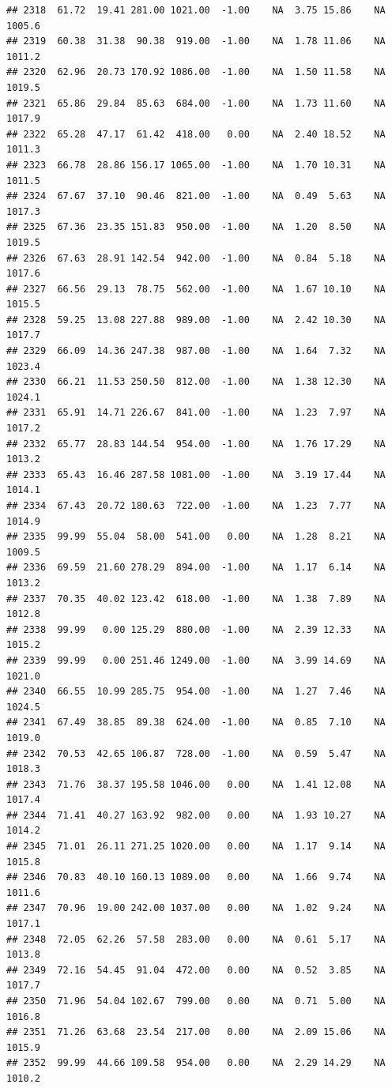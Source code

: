 \documentclass{article}\usepackage{graphicx, color}
\makeatletter
\newenvironment{kframe}{%
 \def\at@end@of@kframe{}%
 \ifinner\ifhmode%
  \def\at@end@of@kframe{\end{minipage}}%
  \begin{minipage}{\columnwidth}%
 \fi\fi%
 \def\FrameCommand##1{\hskip\@totalleftmargin \hskip-\fboxsep
 \colorbox{shadecolor}{##1}\hskip-\fboxsep
     \hskip-\linewidth \hskip-\@totalleftmargin \hskip\columnwidth}%
 \MakeFramed {\advance\hsize-\width
   \@totalleftmargin\z@ \linewidth\hsize
   \@setminipage}}%
 {\par\unskip\endMakeFramed%
 \at@end@of@kframe}
\newenvironment{knitrout}{}{} %
\makeatother
\begin{document}
\begin{knitrout}
\begin{kframe}
\begin{verbatim}
## 2318  61.72  19.41 281.00 1021.00  -1.00    NA  3.75 15.86    NA 1005.6
## 2319  60.38  31.38  90.38  919.00  -1.00    NA  1.78 11.06    NA 1011.2
## 2320  62.96  20.73 170.92 1086.00  -1.00    NA  1.50 11.58    NA 1019.5
## 2321  65.86  29.84  85.63  684.00  -1.00    NA  1.73 11.60    NA 1017.9
## 2322  65.28  47.17  61.42  418.00   0.00    NA  2.40 18.52    NA 1011.3
## 2323  66.78  28.86 156.17 1065.00  -1.00    NA  1.70 10.31    NA 1011.5
## 2324  67.67  37.10  90.46  821.00  -1.00    NA  0.49  5.63    NA 1017.3
## 2325  67.36  23.35 151.83  950.00  -1.00    NA  1.20  8.50    NA 1019.5
## 2326  67.63  28.91 142.54  942.00  -1.00    NA  0.84  5.18    NA 1017.6
## 2327  66.56  29.13  78.75  562.00  -1.00    NA  1.67 10.10    NA 1015.5
## 2328  59.25  13.08 227.88  989.00  -1.00    NA  2.42 10.30    NA 1017.7
## 2329  66.09  14.36 247.38  987.00  -1.00    NA  1.64  7.32    NA 1023.4
## 2330  66.21  11.53 250.50  812.00  -1.00    NA  1.38 12.30    NA 1024.1
## 2331  65.91  14.71 226.67  841.00  -1.00    NA  1.23  7.97    NA 1017.2
## 2332  65.77  28.83 144.54  954.00  -1.00    NA  1.76 17.29    NA 1013.2
## 2333  65.43  16.46 287.58 1081.00  -1.00    NA  3.19 17.44    NA 1014.1
## 2334  67.43  20.72 180.63  722.00  -1.00    NA  1.23  7.77    NA 1014.9
## 2335  99.99  55.04  58.00  541.00   0.00    NA  1.28  8.21    NA 1009.5
## 2336  69.59  21.60 278.29  894.00  -1.00    NA  1.17  6.14    NA 1013.2
## 2337  70.35  40.02 123.42  618.00  -1.00    NA  1.38  7.89    NA 1012.8
## 2338  99.99   0.00 125.29  880.00  -1.00    NA  2.39 12.33    NA 1015.2
## 2339  99.99   0.00 251.46 1249.00  -1.00    NA  3.99 14.69    NA 1021.0
## 2340  66.55  10.99 285.75  954.00  -1.00    NA  1.27  7.46    NA 1024.5
## 2341  67.49  38.85  89.38  624.00  -1.00    NA  0.85  7.10    NA 1019.0
## 2342  70.53  42.65 106.87  728.00  -1.00    NA  0.59  5.47    NA 1018.3
## 2343  71.76  38.37 195.58 1046.00   0.00    NA  1.41 12.08    NA 1017.4
## 2344  71.41  40.27 163.92  982.00   0.00    NA  1.93 10.27    NA 1014.2
## 2345  71.01  26.11 271.25 1020.00   0.00    NA  1.17  9.14    NA 1015.8
## 2346  70.83  40.10 160.13 1089.00   0.00    NA  1.66  9.74    NA 1011.6
## 2347  70.96  19.00 242.00 1037.00   0.00    NA  1.02  9.24    NA 1017.1
## 2348  72.05  62.26  57.58  283.00   0.00    NA  0.61  5.17    NA 1013.8
## 2349  72.16  54.45  91.04  472.00   0.00    NA  0.52  3.85    NA 1017.7
## 2350  71.96  54.04 102.67  799.00   0.00    NA  0.71  5.00    NA 1016.8
## 2351  71.26  63.68  23.54  217.00   0.00    NA  2.09 15.06    NA 1015.9
## 2352  99.99  44.66 109.58  954.00   0.00    NA  2.29 14.29    NA 1010.2

\end{verbatim}
\end{kframe}
\end{knitrout}
\end{document}
